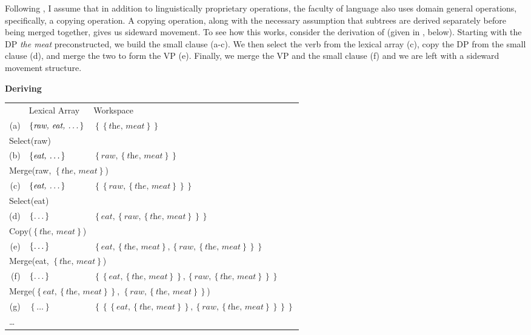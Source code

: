 \documentclass[letterpaper,12pt]{article}
\newcommand{\figex}{\refstepcounter{ExNo}\theExNo\hspace{\Exlabelsep}}
\begin{document}
Following \textcite{hornstein2009theory,nunes2001sideward}, I assume that in addition to linguistically proprietary operations, the faculty of language also uses domain general operations, specifically, a copying operation.
A copying operation, along with the necessary assumption that subtrees are derived separately before being merged together, gives us sideward movement.
To see how this works, consider the derivation of \Last (given in \Next, below).
Starting with the DP \textit{the meat} preconstructed, we build the small clause (a-c).
We then select the verb from the lexical array (c), copy the DP from the small clause (d), and merge the two to form the VP (e).
Finally, we merge the VP and the small clause (f) and we are left with a sideward movement structure.
\begin{table}
  \figex \textbf{Deriving \LLast}\\
  {\small
\begin{tabular}[t]{rll}
  & Lexical Array & Workspace\\
  (a) & $\left\{ \textit{raw, eat, \dots} \right\}$ & $\left\{ \left\{ \textit{the, meat} \right\} \right\}$\\
  \multicolumn{3}{l}{Select(raw)}\\
  (b) & $\left\{ \textit{eat, \dots} \right\}$ & $\left\{ \textit{raw}, \left\{\textit{the, meat}\right\} \right\}$ \\
  \multicolumn{3}{l}{Merge(raw, $\left\{ \textit{the, meat} \right\}$)}\\
  (c) & $\left\{  \textit{eat, \dots}\right\}$ & $\left\{ \left\{ \textit{raw}, \left\{\textit{the, meat}\right\} \right\} \right\}$ \\
  \multicolumn{3}{l}{Select(eat)}\\
  (d) & $\left\{ \textit{\dots} \right\}$ & $\left\{ \textit{eat}, \left\{ \textit{raw}, \left\{\textit{the, meat}\right\} \right\} \right\}$ \\
  \multicolumn{3}{l}{Copy($\left\{ \textit{the, meat} \right\}$)}\\
  (e) & $\left\{ \textit{\dots} \right\}$ &$\left\{ \textit{eat}, \left\{\textit{the, meat}\right\}, \left\{ \textit{raw}, \left\{\textit{the, meat}\right\} \right\} \right\}$ \\
  \multicolumn{3}{l}{Merge(eat,  $\left\{ \textit{the, meat} \right\}$)}\\
  (f) & $\left\{ \textit{\dots} \right\}$ &$\left\{ \left\{\textit{eat}, \left\{\textit{the, meat}\right\}\right\}, \left\{ \textit{raw}, \left\{\textit{the, meat}\right\} \right\} \right\}$ \\
  \multicolumn{3}{l}{Merge($\left\{\textit{eat}, \left\{\textit{the, meat}\right\}\right\}$, $\left\{ \textit{raw}, \left\{\textit{the, meat}\right\} \right\}$)}\\
  (g) & $\left\{ \ldots \right\}$ & $\left\{  \left\{ \left\{\textit{eat}, \left\{\textit{the, meat}\right\}\right\}, \left\{ \textit{raw}, \left\{\textit{the, meat}\right\} \right\} \right\}\right\}$ \\
  \multicolumn{3}{l}{\dots}
\end{tabular}}
\end{table}
\end{document}
